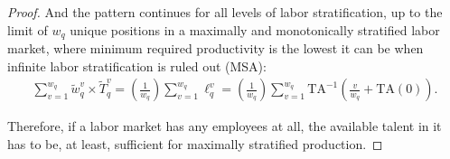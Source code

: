 \documentclass[hidelinks, nonatbib]{elsarticle}
\begin{document}
\begin{lemma}
\begin{proof}
        And the pattern continues for all levels of labor stratification, up to the limit of $w_q$ unique positions in a maximally and monotonically stratified labor market, where minimum required productivity is the lowest it can be when infinite labor stratification is ruled out (MSA):
        \begin{gather}
        \sum_{v=1}^{w_q}{
            \tilde{w}_{q}^{v}
            \times
            \tilde{T}_{q}^{v}
        }
        =
        \left(
            \frac{1}{w_q}
        \right)
        \sum_{v=1}^{w_q}{
            \ell_{q}^{v}
        }
        =
        \left(
            \frac{1}{w_q}
        \right)
        \sum_{v=1}^{w_q}{
            \text{TA}^{-1}\left(
            \frac{v}{w_q}
            +
            \text{TA}(0)
        \right)
        }
        .
        \end{gather}
        
        Therefore, if a labor market has any employees at all, the available talent in it has to be, at least, sufficient for maximally stratified production.
    \end{proof}
\end{lemma}
\end{document}
